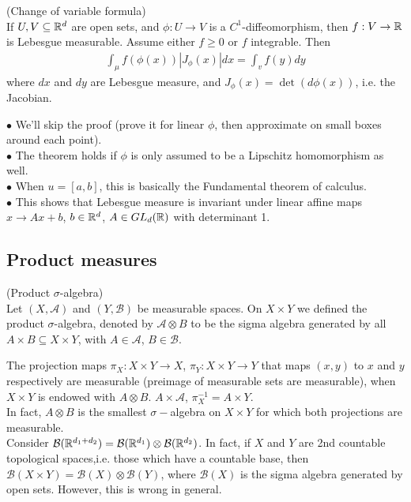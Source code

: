 \documentclass[a4paper]{article}
\begin{document}
\begin{thm} (Change of variable formula)\\
If $U,V \subseteq \mathbb{R}^d$ are open sets, and $\phi: U \to V$ is a $C^1$-diffeomorphism, then $f: V \to \mathbb{R}$ is Lebesgue measurable. Assume either $f \geq 0$ or $f$ integrable. Then
\begin{equation*}
\begin{aligned}
\int_\mu f(\phi(x)) |J_\phi(x)| dx = \int_v f(y) dy
\end{aligned}
\end{equation*}
where $dx$ and $dy$ are Lebesgue measure, and $J_\phi(x) = \det (d\phi(x))$, i.e. the Jacobian.
\end{thm}

\begin{rem}
$\bullet$ We'll skip the proof (prove it for linear $\phi$, then approximate on small boxes around each point).\\
$\bullet$ The theorem holds if $\phi$ is only assumed to be a Lipschitz homomorphism as well.\\
$\bullet$ When $u=[a,b]$, this is basically the Fundamental theorem of calculus.\\
$\bullet$ This shows that Lebesgue measure is invariant under linear affine maps $x \to Ax+b$, $b \in \mathbb{R}^d$, $A \in GL_d (\mathbb{R})$ with determinant 1.
\end{rem}

\subsection{Product measures}

\begin{defi} (Product $\sigma$-algebra)\\
Let $(X,\mathcal{A})$ and $(Y,\mathcal{B})$ be measurable spaces. On $X \times Y$ we defined the product $\sigma$-algebra, denoted by $\mathcal{A} \otimes B$ to be the sigma algebra generated by all $A\times B \subseteq X \times Y$, with $A \in \mathcal{A}$, $B \in \mathcal{B}$.
\end{defi}

\begin{rem}
The projection maps $\pi_X:X \times Y \to X$, $\pi_Y:X \times Y \to Y$ that maps $(x,y)$ to $x$ and $y$ respectively are measurable (preimage of measurable sets are measurable), when $X \times Y$ is endowed with $A \otimes B$. $A \times \mathcal{A}$, $\pi^{-1}_X = A \times Y$.\\
In fact, $A \otimes B$ is the smallest $\sigma-$algebra on $X \times Y$ for which both projections are measurable.\\
Consider $\mathcal{B}(\mathbb{R}^{d_1+d_2}) = \mathcal{B}(\mathbb{R}^{d_1}) \otimes \mathcal{B}(\mathbb{R}^{d_2})$. In fact, if $X$ and $Y$ are 2nd countable topological spaces,i.e. those which have a countable base, then $\mathcal{B}(X \times Y) = \mathcal{B}(X) \otimes \mathcal{B}(Y)$, where $\mathcal{B}(X)$ is the sigma algebra generated by open sets. However, this is wrong in general.
\end{rem}
\end{document}
